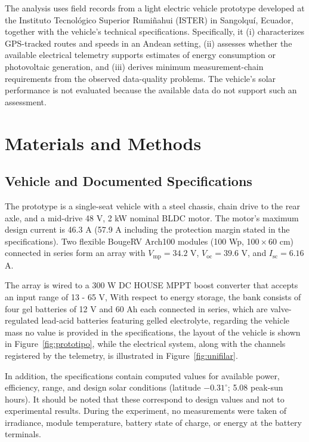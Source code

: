 \documentclass[vehicles,article,submit,moreauthors]{Definitions/mdpi}
\begin{document}
The analysis uses field records from a light electric vehicle prototype developed at the Instituto Tecnológico Superior Rumiñahui (ISTER) in Sangolquí, Ecuador, together with the vehicle's technical specifications. Specifically, it (i) characterizes GPS-tracked routes and speeds in an Andean setting, (ii) assesses whether the available electrical telemetry supports estimates of energy consumption or photovoltaic generation, and (iii) derives minimum measurement-chain requirements from the observed data-quality problems.
The vehicle's solar performance is not evaluated because the available data do not support such an assessment.

\section{Materials and Methods}

\subsection{Vehicle and Documented Specifications}

The prototype is a single-seat vehicle with a steel chassis, chain drive to the rear axle, and a mid-drive 48 V, 2 kW nominal BLDC motor. The motor's maximum design current is 46.3 A (57.9 A including the protection margin stated in the specifications). Two flexible BougeRV Arch100 modules (100 Wp, 100\,$\times$\,60 cm) connected in series form an array with $V_{\mathrm{mp}}=34.2$ V, $V_{\mathrm{oc}}=39.6$ V, and $I_{\mathrm{sc}}=6.16$ A.

The array is wired to a 300 W DC HOUSE MPPT boost converter that accepts an input range of 13 - 65 V, With respect to energy storage, the bank consists of four gel batteries of 12 V and 60 Ah each connected in series, which are valve-regulated lead-acid batteries featuring gelled electrolyte, regarding the vehicle mass no value is provided in the specifications, the layout of the vehicle is shown in Figure~\ref{fig:prototipo}, while the electrical system, along with the channels registered by the telemetry, is illustrated in Figure~\ref{fig:unifilar}.

In addition, the specifications contain computed values for available power, efficiency, range, and design solar conditions (latitude $-0.31^\circ$; 5.08 peak-sun hours). It should be noted that these correspond to design values and not to experimental results. During the experiment, no measurements were taken of irradiance, module temperature, battery state of charge, or energy at the battery terminals.
\end{document}
